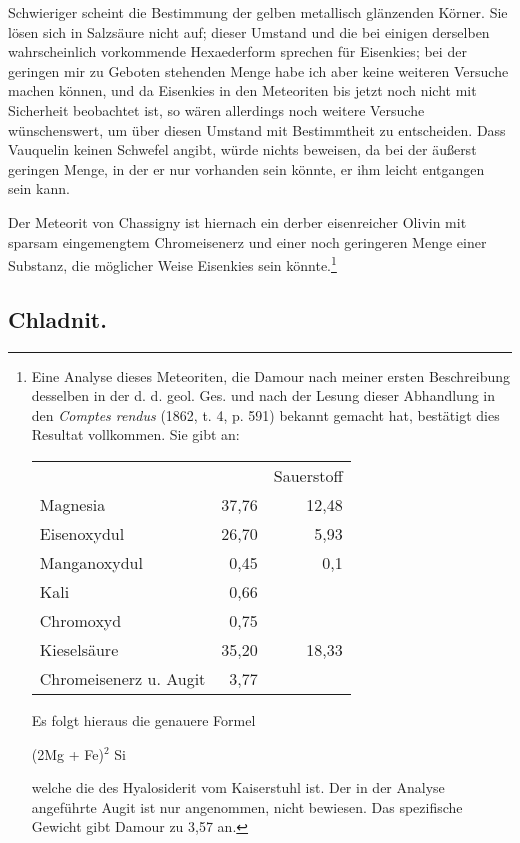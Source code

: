 \documentclass[a4paper, 11pt, oneside]{article}
\begin{document}
Schwieriger scheint die Bestimmung der gelben metallisch glänzenden Körner. Sie lösen sich in Salzsäure nicht auf; dieser Umstand und die bei einigen derselben wahrscheinlich vorkommende Hexaederform sprechen für Eisenkies; bei der geringen mir zu Geboten stehenden Menge habe ich aber keine weiteren Versuche machen können, und da Eisenkies in den Meteoriten bis jetzt noch nicht mit Sicherheit beobachtet ist, so wären allerdings noch weitere Versuche wünschenswert, um über diesen Umstand mit Bestimmtheit zu entscheiden. Dass Vauquelin keinen Schwefel angibt, würde nichts beweisen, da bei der äußerst geringen Menge, in der er nur vorhanden sein könnte, er ihm leicht entgangen sein kann.

Der Meteorit von Chassigny ist hiernach ein derber eisenreicher Olivin mit sparsam eingemengtem Chromeisenerz und einer noch geringeren Menge einer Substanz, die möglicher Weise Eisenkies sein könnte.\footnote{Eine Analyse dieses Meteoriten, die Damour nach meiner ersten Beschreibung desselben in der d. d. geol. Ges. und nach der Lesung dieser Abhandlung in den \emph{Comptes rendus} (1862, t. 4, p. 591) bekannt gemacht hat, bestätigt dies Resultat vollkommen. Sie gibt an:
\begin{center}
\begin{tabular}{ l r r }
     & & Sauerstoff\\
    Magnesia & 37,76 & 12,48\\
    Eisenoxydul & 26,70 & 5,93\\
    Manganoxydul & 0,45 & 0,1\\
    Kali & 0,66 & \\
    Chromoxyd & 0,75 & \\
    Kieselsäure & 35,20 & 18,33\\
    Chromeisenerz u. Augit & 3,77 & \\
\end{tabular}
\end{center}
Es folgt hieraus die genauere Formel
\begin{center}
(2Mg + Fe)$^{2}$ Si
\end{center}
welche die des Hyalosiderit vom Kaiserstuhl ist. Der in der Analyse angeführte Augit ist nur angenommen, nicht bewiesen. Das spezifische Gewicht gibt Damour zu 3,57 an.}
\subsection{Chladnit.}
\end{document}
